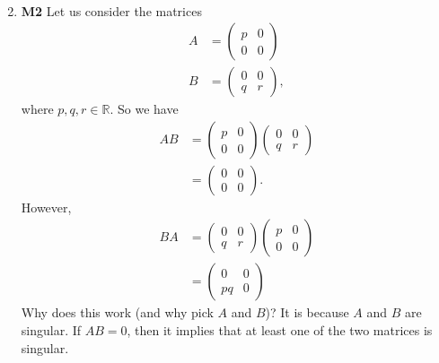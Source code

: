 \documentclass[12pt,oneside]{book}
\begin{document}
\begin{enumerate}
\begin{enumerate}
\begin{align*}
            \end{align*}
        \end{enumerate}
        \item \textbf{M2} Let us consider the matrices \begin{align*}
            A &= \begin{pmatrix} p & 0 \\ 0 & 0 \end{pmatrix} \\
            B &= \begin{pmatrix} 0 & 0 \\ q & r \end{pmatrix},
        \end{align*}
        where $p, q, r \in \mathbb{R}$. So we have \begin{align*}
            AB &= \begin{pmatrix} 
                p & 0 \\ 
                0 & 0 
            \end{pmatrix} \begin{pmatrix} 
                0 & 0 \\
                q & r
            \end{pmatrix} \\
            &= \begin{pmatrix} 
                0 & 0 \\
                0 & 0
            \end{pmatrix}.
        \end{align*}
        However, \begin{align*}
            BA &= \begin{pmatrix} 
                0 & 0 \\
                q & r
            \end{pmatrix} \begin{pmatrix} 
                p & 0 \\ 
                0 & 0 
            \end{pmatrix} \\
            &= \begin{pmatrix} 
                0 & 0 \\
                pq & 0
            \end{pmatrix}
        \end{align*}
        Why does this work (and why pick $A$ and $B$)? It is because $A$ and $B$ are singular. 
        If $AB = 0$, then it implies that at least one of the two matrices is singular. 

\end{enumerate}
\end{document}
